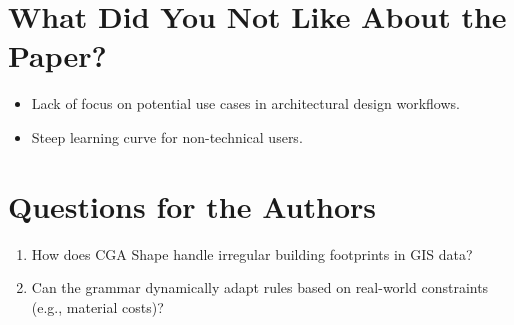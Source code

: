 \documentclass[12pt]{article}
\begin{document}
\section{What Did You Not Like About the Paper?}
\begin{itemize}[noitemsep]
    \item Lack of focus on potential use cases in architectural design workflows.
    \item Steep learning curve for non-technical users.
\end{itemize}

\section{Questions for the Authors}
\begin{enumerate}[noitemsep]
    \item How does CGA Shape handle irregular building footprints in GIS data?
    \item Can the grammar dynamically adapt rules based on real-world constraints (e.g., material costs)?
\end{enumerate}
\end{document}
